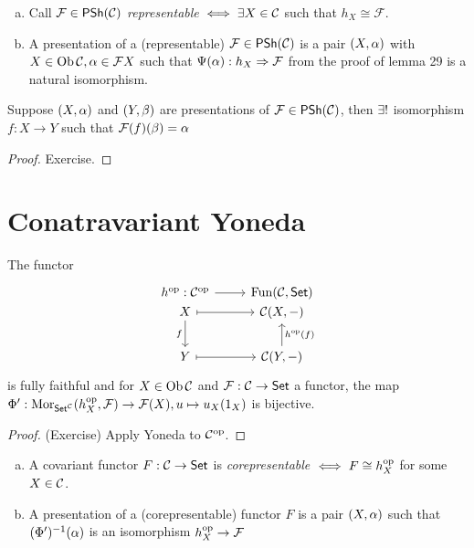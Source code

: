 \documentclass[a4paper]{report}
\begin{document}
\begin{defi}
\begin{enumerate}[(a)]
  \item Call $\mathcal F \in \mathsf{PSh} (\mathcal{C})$ \emph{representable} $\iff \exists X \in \mathcal{C}$ such that $h_{X} \cong \mathcal F$.
  \item A presentation of a (representable) $\mathcal F \in \mathsf{PSh} (\mathcal{C})$ is a pair $(X,\alpha)$ with $X \in \operatorname{Ob} \mathcal{C}, \alpha \in \mathcal FX$ such that $\Psi(\alpha): h_{X} \Rightarrow \mathcal F$ from the proof of lemma 29 is a natural isomorphism. %
\end{enumerate}
\end{defi}
\begin{prop}
  Suppose $(X, \alpha)$ and $(Y,\beta)$ are presentations of $\mathcal F \in \mathsf{PSh} (\mathcal{C})$, then $\exists!$ isomorphism $f: X \to Y$ such that $\mathcal F(f)(\beta) = \alpha$
  \begin{proof}
Exercise.
  \end{proof}
\end{prop}

\section{Conatravariant Yoneda}
\begin{prop}
  The functor
  \[\begin{tikzcd}
h\op: \C\op \arrow[r]               & \Fun(\C, \Set)                        \\[-20]
X \arrow[r, maps to] \arrow[d, "f"'] & {\C(X, -)}                      \\
Y \arrow[r, maps to]                 & {\C(Y,-)} \arrow[u, "h\op(f)"']
\end{tikzcd}\]
is fully faithful and for $X \in \operatorname{Ob} \mathcal{C}$ and $\mathcal F: \mathcal{C} \to \mathsf{Set}$ a functor, the map $\Phi': \operatorname{Mor}_{\mathsf{Set}^{\mathcal{C}}}(h^\mathrm{op}_{X}, \mathcal F) \to \mathcal F(X), u \mapsto u_{X}(1_{X})$ is bijective.
\begin{proof}
(Exercise) Apply Yoneda to $\mathcal{C}^\mathrm{op}$.
\end{proof}
\end{prop}

\begin{defi}
\begin{enumerate}[(a)]
  \item A covariant functor $F: \mathcal{C} \to \mathsf{Set}$ is \emph{corepresentable} $\iff F \cong h_{X}^\mathrm{op}$ for some $X \in \mathcal{C}$.
        \item A presentation of a (corepresentable) functor $F$ is a pair $(X, \alpha)$ such that $(\Phi')^{-1}(\alpha)$ is an isomorphism $h_{X}^\mathrm{op} \to \mathcal F$
\end{enumerate}
\end{defi}
\end{document}
